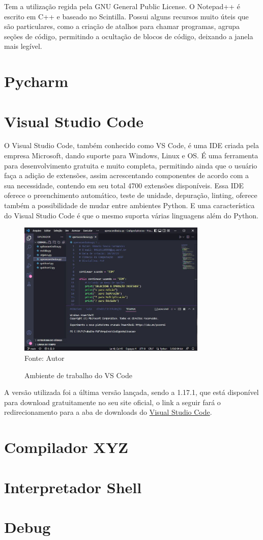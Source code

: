 	Tem a utilização regida pela GNU General Public License. O Notepad++ é escrito em C++ e baseado no Scintilla. Possui alguns recursos muito úteis que são particulares, como a criação de atalhos para chamar programas, agrupa seções de código, permitindo a ocultação de blocos de código, deixando a janela mais legível.
	
     \section{Pycharm}
    
    \section{Visual Studio Code}
	O Visual Studio Code, também conhecido como VS Code, é uma IDE criada pela empresa Microsoft, dando suporte para Windows, Linux e OS. É uma ferramenta para desenvolvimento 
	gratuita e muito completa, permitindo ainda que o usuário faça a adição de extensões, assim acrescentando componentes de acordo com a sua necessidade, contendo em seu total 4700 extensões disponíveis. Essa IDE oferece o preenchimento automático, teste de unidade, depuração, linting, oferece também a possibilidade de mudar entre ambientes Python. E uma característica do Visual Studio Code é que o mesmo suporta várias linguagens além do Python.
    
    \begin{figure}[H]
    	\begin{center}
    		\caption{Ambiente de trabalho do VS Code} \label{ling1}
    		\includegraphics[width=9cm]{vscode.JPG} \\
    		{\tiny \sf Fonte:{ Autor}}
    	\end{center}
    \end{figure}
    
    A versão utilizada foi a última versão lançada, sendo a 1.17.1, que está disponível para download gratuitamente no seu site oficial, o link a seguir fará o redirecionamento para a aba de downloads do \href{https://code.visualstudio.com}{Visual Studio Code}.
    
    \section{Compilador XYZ}


    \section{Interpretador Shell}

   
    \section{Debug}
     